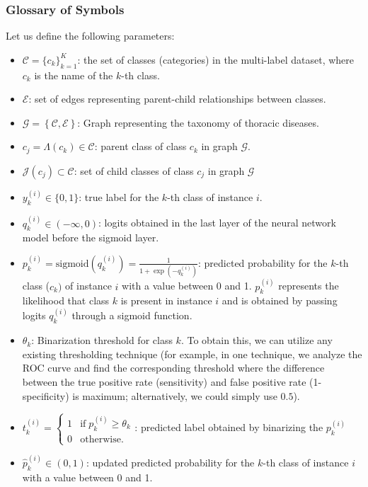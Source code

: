 \documentclass[review,1p,times,numbers]{elsarticle}
\begin{document}
\subsubsection{Glossary of Symbols}\label{subsubsec:notations}
Let us define the following parameters:
\begin{itemize}
    \item  $\mathcal{C} = {\{c_k\}}_{k=1}^{K}  $: the set of classes (categories) in the multi-label dataset, where $c_k $ is the name of the $k $-th class.
    \item  $\mathcal{E} $: set of edges representing parent-child relationships between classes.
    \item  $\mathcal{G}=\left\{\mathcal{C},\mathcal{E}\right\} $:  Graph representing the taxonomy of thoracic diseases.
    \item  $c_j=\Lambda (c_k) \in \mathcal{C}$: parent class of class $c_k $ in graph $\mathcal{G} $.
    \item  $\mathcal{J}(c_j) \subset \mathcal{C}$: set of child classes of class $c_j$ in graph $\mathcal{G} $
    \item  $y_k^{(i)} \in \{0,1\} $: true label for the $k $-th class of instance $i $.
    \item  $q_k^{(i)} \in \left( -\infty,0 \right) $: logits obtained in the last layer of the neural network model before the sigmoid layer.
    \item  $p_k^{(i)} = \text{sigmoid}\left(q_k^{(i)}\right) = \frac{1}{1+\exp{\left(-q_k^{(i)}\right)}} $: predicted probability for the $k $-th class ($c_k) $ of instance $i $ with a value between 0 and 1. $p_k^{(i)} $ represents the likelihood that class $k $ is present in instance $i $ and is obtained by passing logits $q_k^{(i)} $ through a sigmoid function.
    \item  $\theta_k $: Binarization threshold for class $k $.  To obtain this, we can utilize any existing thresholding technique (for example, in one technique, we analyze the ROC curve and find the corresponding threshold where the difference between the true positive rate (sensitivity) and false positive rate (1-specificity) is maximum; alternatively, we could simply use $0.5 $).
    \item  $t_k^{(i)}=\left\{\begin{array}{ll}1&\text{if}\;p_k^{(i)} \geq \theta_k\\0&\text{otherwise.}\end{array}\right. $: predicted label obtained by binarizing the $p_k^{(i)} $
    \item  ${\widehat p}_k^{(i)} \in (0,1) $: updated predicted probability for the $k $-th class of instance $i $ with a value between 0 and 1.

\end{itemize}
\end{document}
